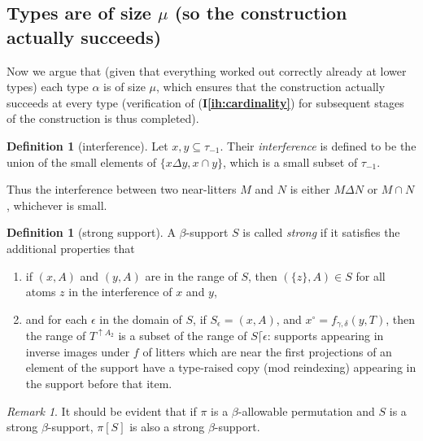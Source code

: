 \documentclass[112pt]{article}
\theoremstyle{definition}
\newtheorem{definition}[theorem]{Definition}
\theoremstyle{remark}
\newtheorem{remark}[theorem]{Remark}
\newcommand{\ihref}[1]{(\textbf{I\ref{#1}})}
\begin{document}
\newpage
\subsection{Types are of size $\mu$ (so the construction actually succeeds)}

Now we argue that (given that everything worked out correctly already at lower types) each type $\alpha$ is of size $\mu$, which ensures
that the construction actually succeeds at every type (verification of \ihref{ih:cardinality} for subsequent stages of the construction is thus completed).





\begin{definition}[interference]
Let $x, y \subseteq \tau_{-1}$.
Their {\em interference\/} is defined to be the union of the small elements of $\{ x \Delta y, x \cap y \}$, which is a small subset of $\tau_{-1}$.
\end{definition}
Thus the interference between two near-litters $M$ and $N$ is either $M \Delta N$ or $M \cap N$, whichever is small.
\begin{definition}[strong support]\label{def:strong_support}
A $\beta$-support $S$ is called {\em strong\/} 
if it satisfies the additional properties that

\begin{enumerate}

\item if $(x,A)$ and $(y,A)$ are in the range of $S$, then $(\{z\},A) \in S$ for all atoms $z$ in the interference of $x$ and $y$,

\item and for each $\epsilon$ in the domain of $S$, if $S_\epsilon = (x,A)$, and $x^\circ = f_{\gamma,\delta}(y,T)$, then the range of $T^{\uparrow A_2}$ is a subset of the range of $S \lceil \epsilon$:  supports appearing in inverse images under $f$ of litters which are near the first projections of an element of the support have a type-raised copy (mod reindexing) appearing in the support before that item.
\end{enumerate}
\end{definition}


\begin{remark}
It should be evident that if $\pi$ is a $\beta$-allowable permutation and $S$ is a strong $\beta$-support,
$\pi[S]$ is also a strong $\beta$-support.
\end{remark}
\end{document}
